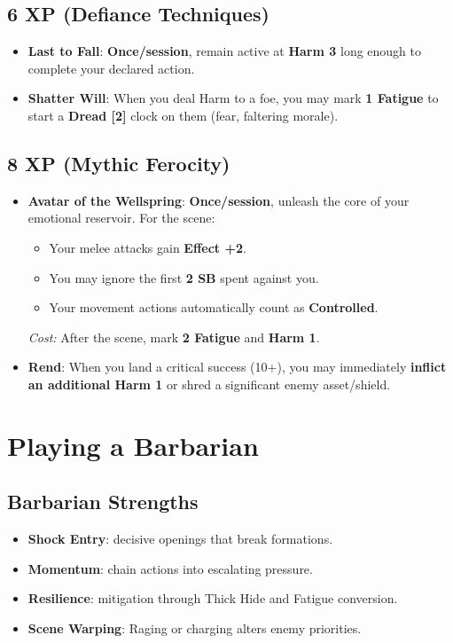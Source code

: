 \documentclass[11pt]{book}
\begin{document}
\subsection*{6 XP (Defiance Techniques)}
\begin{itemize}
  \item \textbf{Last to Fall}: \textbf{Once/session}, remain active at \textbf{Harm 3} long
    enough to complete your declared action.
  \item \textbf{Shatter Will}: When you deal Harm to a foe, you may mark \textbf{1 Fatigue} to
    start a \textbf{Dread [2]} clock on them (fear, faltering morale).
\end{itemize}

\subsection*{8 XP (Mythic Ferocity)}
\begin{itemize}
  \item \textbf{Avatar of the Wellspring}: \textbf{Once/session}, unleash the core of your
    emotional reservoir. For the scene:
    \begin{itemize}
      \item Your melee attacks gain \textbf{Effect +2}.  
      \item You may ignore the first \textbf{2 SB} spent against you.  
      \item Your movement actions automatically count as \textbf{Controlled}.  
    \end{itemize}
    \textit{Cost:} After the scene, mark \textbf{2 Fatigue} and \textbf{Harm 1}.
  \item \textbf{Rend}: When you land a critical success (10+), you may immediately
    \textbf{inflict an additional Harm 1} or shred a significant enemy asset/shield.
\end{itemize}

\section{Playing a Barbarian}
\subsection{Barbarian Strengths}
\begin{itemize}
  \item \textbf{Shock Entry}: decisive openings that break formations.
  \item \textbf{Momentum}: chain actions into escalating pressure.
  \item \textbf{Resilience}: mitigation through Thick Hide and Fatigue conversion.
  \item \textbf{Scene Warping}: Raging or charging alters enemy priorities.
\end{itemize}
\end{document}
